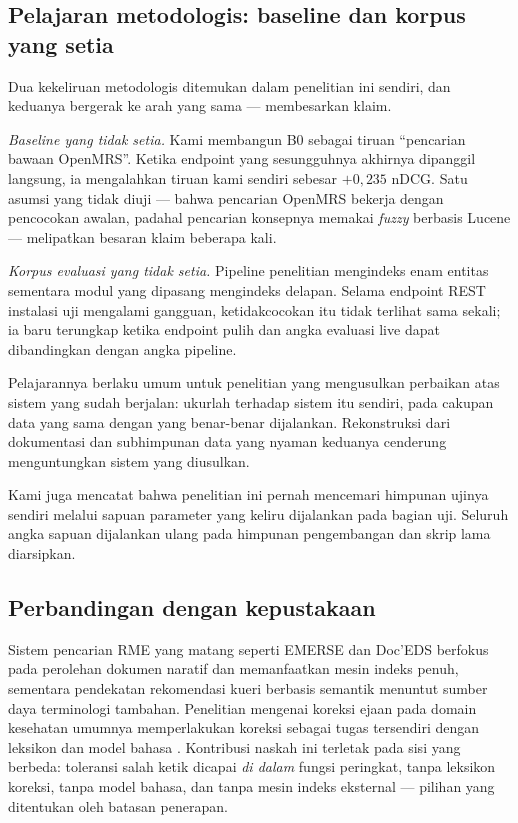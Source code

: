 \documentclass[journal,twoside,web]{ieeecolor}
\begin{document}
\subsection{Pelajaran metodologis: baseline dan korpus yang setia}

Dua kekeliruan metodologis ditemukan dalam penelitian ini sendiri, dan keduanya
bergerak ke arah yang sama --- membesarkan klaim.

\emph{Baseline yang tidak setia.} Kami membangun B0 sebagai tiruan ``pencarian
bawaan OpenMRS''. Ketika endpoint yang sesungguhnya akhirnya dipanggil langsung,
ia mengalahkan tiruan kami sendiri sebesar $+0{,}235$ nDCG. Satu asumsi yang
tidak diuji --- bahwa pencarian OpenMRS bekerja dengan pencocokan awalan,
padahal pencarian konsepnya memakai \emph{fuzzy} berbasis Lucene --- melipatkan
besaran klaim beberapa kali.

\emph{Korpus evaluasi yang tidak setia.} Pipeline penelitian mengindeks enam
entitas sementara modul yang dipasang mengindeks delapan. Selama endpoint REST
instalasi uji mengalami gangguan, ketidakcocokan itu tidak terlihat sama sekali;
ia baru terungkap ketika endpoint pulih dan angka evaluasi live dapat
dibandingkan dengan angka pipeline.

Pelajarannya berlaku umum untuk penelitian yang mengusulkan perbaikan atas sistem
yang sudah berjalan: ukurlah terhadap sistem itu sendiri, pada cakupan data yang
sama dengan yang benar-benar dijalankan. Rekonstruksi dari dokumentasi dan
subhimpunan data yang nyaman keduanya cenderung menguntungkan sistem yang
diusulkan.

Kami juga mencatat bahwa penelitian ini pernah mencemari himpunan ujinya sendiri
melalui sapuan parameter yang keliru dijalankan pada bagian uji. Seluruh angka
sapuan dijalankan ulang pada himpunan pengembangan dan skrip lama diarsipkan.

\subsection{Perbandingan dengan kepustakaan}

Sistem pencarian RME yang matang seperti EMERSE \cite{hanauer2015} dan
Doc'EDS \cite{pressat2022} berfokus pada perolehan dokumen naratif dan
memanfaatkan mesin indeks penuh, sementara pendekatan rekomendasi kueri berbasis
semantik \cite{wu2023} menuntut sumber daya terminologi tambahan. Penelitian
mengenai koreksi ejaan pada domain kesehatan umumnya memperlakukan koreksi
sebagai tugas tersendiri dengan leksikon dan model bahasa
\cite{crowell2004, lai2015, kilicoglu2015}. Kontribusi naskah ini terletak pada
sisi yang berbeda: toleransi salah ketik dicapai \emph{di dalam} fungsi
peringkat, tanpa leksikon koreksi, tanpa model bahasa, dan tanpa mesin indeks
eksternal --- pilihan yang ditentukan oleh batasan penerapan.
\end{document}
